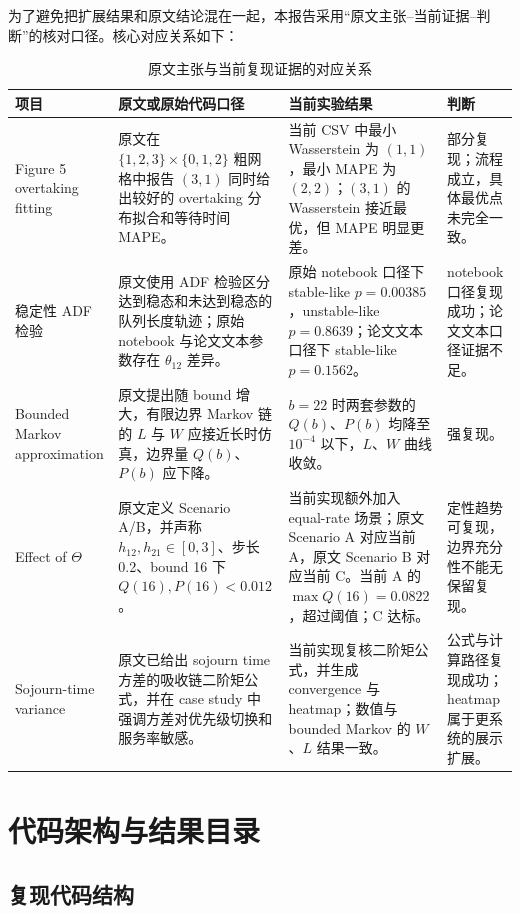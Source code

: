 \documentclass[UTF8,a4paper,11pt]{ctexart}
\begin{document}
为了避免把扩展结果和原文结论混在一起，本报告采用“原文主张--当前证据--判断”的核对口径。核心对应关系如下：

\begin{table}[H]
\centering
\caption{原文主张与当前复现证据的对应关系}
\begin{tabularx}{\textwidth}{@{}p{}p{}p{}X@{}}
\toprule
项目 & 原文或原始代码口径 & 当前实验结果 & 判断 \\
\midrule
Figure 5 overtaking fitting & 原文在 $\{1,2,3\}\times\{0,1,2\}$ 粗网格中报告 $(3,1)$ 同时给出较好的 overtaking 分布拟合和等待时间 MAPE。 & 当前 CSV 中最小 Wasserstein 为 $(1,1)$，最小 MAPE 为 $(2,2)$；$(3,1)$ 的 Wasserstein 接近最优，但 MAPE 明显更差。 & 部分复现；流程成立，具体最优点未完全一致。\\
稳定性 ADF 检验 & 原文使用 ADF 检验区分达到稳态和未达到稳态的队列长度轨迹；原始 notebook 与论文文本参数存在 $\theta_{12}$ 差异。 & 原始 notebook 口径下 stable-like $p=0.00385$，unstable-like $p=0.8639$；论文文本口径下 stable-like $p=0.1562$。 & notebook 口径复现成功；论文文本口径证据不足。\\
Bounded Markov approximation & 原文提出随 bound 增大，有限边界 Markov 链的 $L$ 与 $W$ 应接近长时仿真，边界量 $Q(b)$、$P(b)$ 应下降。 & $b=22$ 时两套参数的 $Q(b)$、$P(b)$ 均降至 $10^{-4}$ 以下，$L$、$W$ 曲线收敛。 & 强复现。\\
Effect of $\Theta$ & 原文定义 Scenario A/B，并声称 $h_{12},h_{21}\in[0,3]$、步长 0.2、bound 16 下 $Q(16),P(16)<0.012$。 & 当前实现额外加入 equal-rate 场景；原文 Scenario A 对应当前 A，原文 Scenario B 对应当前 C。当前 A 的 $\max Q(16)=0.0822$，超过阈值；C 达标。 & 定性趋势可复现，边界充分性不能无保留复现。\\
Sojourn-time variance & 原文已给出 sojourn time 方差的吸收链二阶矩公式，并在 case study 中强调方差对优先级切换和服务率敏感。 & 当前实现复核二阶矩公式，并生成 convergence 与 heatmap；数值与 bounded Markov 的 $W$、$L$ 结果一致。 & 公式与计算路径复现成功；heatmap 属于更系统的展示扩展。\\
\bottomrule
\end{tabularx}
\end{table}

\section{代码架构与结果目录}

\subsection{复现代码结构}
\end{document}
